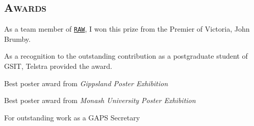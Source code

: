 \begin{resume}
\section{\textsc{Awards}}


\begin{position}
As a team member of \href{http://www.remindanyway.com/}{\tt RAW}, I won this prize from the Premier of Victoria, John Brumby.
\end{position}
\vspace{-0.2cm}
\begin{position}
As a recognition to the outstanding contribution as a postgraduate student of GSIT, Telstra provided the award.
\end{position}

\vspace{-0.2cm}

\begin{position}
Best poster award from \textit{Gippsland Poster Exhibition}
\end{position}

\vspace{-0.2cm}

\begin{position}
Best poster award from \textit{Monash University Poster Exhibition}
\end{position}

\vspace{-0.2cm}

\begin{position}
For outstanding work as a GAPS Secretary
\end{position}

%



\end{resume}
